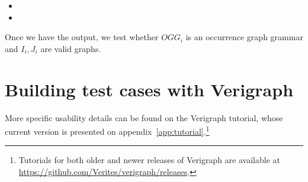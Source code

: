 \begin{example}
\end{example}

\begin{example}
\end{example}

\begin{itemize}
  \item
  \item 
\end{itemize}

Once we have the output, we test whether $OGG_i$ is an occurrence graph grammar and $I_i, J_i$ are valid graphs.

\begin{example}[]
\end{example}

\section{Building test cases with Verigraph}

More specific usability details can be found on the Verigraph tutorial, whose current version is presented on appendix~\ref{app:tutorial}.\footnote{Tutorials for both older and newer releases of Verigraph are available at \url{https://github.com/Verites/verigraph/releases}.}
